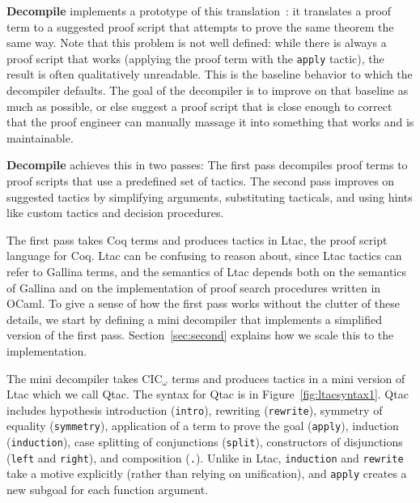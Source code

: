 
\textbf{Decompile} implements a prototype of this translation~\href{https://github.com/uwplse/coq-plugin-lib/tree/9ef05815c261de9c99b604c6b581ba1c4fbc1a46/src/coq/decompiler/decompiler.ml}{}: %
it translates a proof term to a suggested proof script that attempts to prove the same theorem the same way.
Note that this problem is not well defined: while there is always a proof script that 
works (applying the proof term with the \lstinline{apply} tactic), the result is often qualitatively unreadable.
This is the baseline behavior to which the decompiler defaults.
The goal of the decompiler is to improve on that baseline as much as possible,
or else suggest a proof script that is close enough to correct that the proof engineer can
manually massage it into something that works and is maintainable.

\textbf{Decompile} achieves this in two passes: The first pass decompiles proof terms to proof scripts that use a predefined set of tactics.
The second pass improves on suggested tactics by simplifying arguments, substituting tacticals, and using
hints like custom tactics and decision procedures.

The first pass takes Coq terms and produces tactics in Ltac, the proof script language for Coq.
Ltac can be confusing to reason about, since Ltac tactics can refer to Gallina terms, and the semantics of Ltac depends both on the
semantics of Gallina and on the implementation of proof search procedures written in OCaml.
To give a sense of how the first pass works without the clutter of these details, we start by defining a mini decompiler that 
implements a simplified version of the first pass.
Section~\ref{sec:second} explains how we scale this to the implementation.

The mini decompiler takes CIC$_{\omega}$ terms and produces tactics in a 
mini version of Ltac which we call Qtac.
The syntax for Qtac is in Figure~\ref{fig:ltacsyntax1}.
Qtac includes hypothesis introduction (\lstinline{intro}),
rewriting (\lstinline{rewrite}), symmetry of equality (\lstinline{symmetry}),
application of a term to prove the goal (\lstinline{apply}), induction (\lstinline{induction}),
case splitting of conjunctions (\lstinline{split}),
constructors of disjunctions (\lstinline{left} and \lstinline{right}), and
composition (\lstinline{.}).
Unlike in Ltac, \lstinline{induction} and \lstinline{rewrite} take a motive explicitly (rather than relying on unification),
and \lstinline{apply} creates a new subgoal for each function argument.


